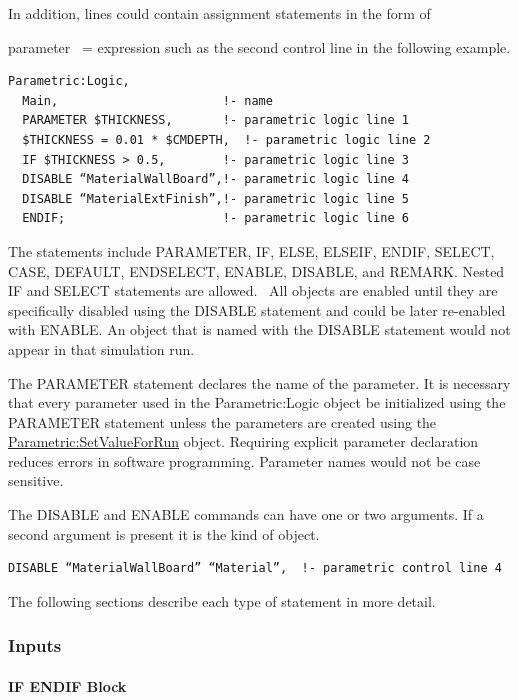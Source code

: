 In addition, lines could contain assignment statements in the form of

parameter~ = expression such as the second control line in the following example.

\begin{lstlisting}
Parametric:Logic,
  Main,                       !- name
  PARAMETER $THICKNESS,       !- parametric logic line 1
  $THICKNESS = 0.01 * $CMDEPTH,  !- parametric logic line 2
  IF $THICKNESS > 0.5,        !- parametric logic line 3
  DISABLE “MaterialWallBoard”,!- parametric logic line 4
  DISABLE “MaterialExtFinish”,!- parametric logic line 5
  ENDIF;                      !- parametric logic line 6
\end{lstlisting}

The statements include PARAMETER, IF, ELSE, ELSEIF, ENDIF, SELECT, CASE, DEFAULT, ENDSELECT, ENABLE, DISABLE, and REMARK. Nested IF and SELECT statements are allowed.~ All objects are enabled until they are specifically disabled using the DISABLE statement and could be later re-enabled with ENABLE. An object that is named with the DISABLE statement would not appear in that simulation run.

The PARAMETER statement declares the name of the parameter. It is necessary that every parameter used in the Parametric:Logic object be initialized using the PARAMETER statement unless the parameters are created using the \hyperref[parametricsetvalueforrun]{Parametric:SetValueForRun} object. Requiring explicit parameter declaration reduces errors in software programming. Parameter names would not be case sensitive.

The DISABLE and ENABLE commands can have one or two arguments. If a second argument is present it is the kind of object.

\begin{lstlisting}
DISABLE “MaterialWallBoard” “Material”,  !- parametric control line 4
\end{lstlisting}

The following sections describe each type of statement in more detail.

\subsubsection{Inputs}\label{inputs-1-027}

\paragraph{IF ENDIF Block}\label{if-endif-block}

